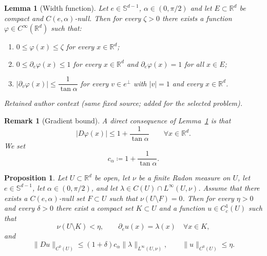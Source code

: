 \documentclass[10pt,a4paper]{amsart}
\newtheorem{lem}{Lemma}
\newtheorem{prop}{Proposition}
\newcommand{\R}{\mathbb{R}}
\newtheorem{rem}{Remark}
\begin{document}
\begin{lem}[Width function]\label{lem:width}
Let $e\in \mathbb{S}^{d-1}$, $\alpha\in(0,\pi/2)$ and let $E\subset\R^d$ be compact and $C(e,\alpha)$-null.
Then for every $\zeta>0$ there exists a function $\varphi\in C^\infty(\R^d)$ such that:
\begin{enumerate}[label=\rm(\roman*),leftmargin=2em]
\item $0\le \varphi(x)\le \zeta$ for every $x \in \R^d$;
\item $0\le \partial_e\varphi(x)\le 1$ for every $x \in \R^d$ and $\partial_e\varphi(x)=1$ for all $x \in E$;
\item $|\partial_v\varphi(x)| \le \dfrac{1}{\tan\alpha}$ for every $v \in e^\perp$ with $|v|=1$ and every $x \in \R^d$.
\end{enumerate}
\end{lem}

\par\medskip\noindent\textit{Retained author context (same fixed source; added for the selected problem).}\par
\begin{rem}[Gradient bound]\label{rem:gradphi}
A direct consequence of Lemma~\ref{lem:width} is that
$$
|D\varphi(x)|
\le 1+\frac{1}{\tan\alpha}
\qquad\forall x\in\R^d.
$$
We set
$$
c_\alpha\coloneqq 1+\frac{1}{\tan\alpha}.
$$
\end{rem}

\begin{prop}\label{prop:local}
Let $U\subset\R^d$ be open, let $\nu$ be a finite Radon measure on $U$, let $e\in \mathbb{S}^{d-1}$, let $\alpha\in(0,\pi/2)$,
and let $\lambda\in C(U)\cap L^\infty(U, \nu)$.
Assume that there exists a $C(e,\alpha)$-null set $F\subset U$ such that $\nu(U\setminus F)=0$.
Then for every $\eta>0$ and every $\delta>0$ there exist a compact set $K\subset U$ and a function $u\in C^1_c(U)$ such that
$$
\nu(U\setminus K)<\eta,
\qquad
\partial_e u(x)=\lambda(x)\quad\forall x\in K,
$$
and
$$
\|Du\|_{C^0(U)}\le (1+\delta)c_\alpha \|\lambda\|_{L^\infty(U,\nu)},
\qquad
\|u\|_{C^0(U)}\le \eta.
$$
\end{prop}
\end{document}
